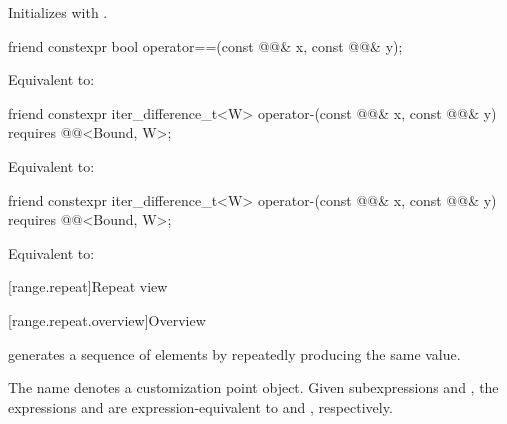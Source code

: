 \begin{itemdescr}
\pnum
\effects
Initializes  with .
\end{itemdescr}

\begin{itemdecl}
friend constexpr bool operator==(const @@& x, const @@& y);
\end{itemdecl}

\begin{itemdescr}
\pnum
\effects
Equivalent to: 
\end{itemdescr}

\begin{itemdecl}
friend constexpr iter_difference_t<W> operator-(const @@& x, const @@& y)
  requires @@<Bound, W>;
\end{itemdecl}

\begin{itemdescr}
\pnum
\effects
Equivalent to: 
\end{itemdescr}

\begin{itemdecl}
friend constexpr iter_difference_t<W> operator-(const @@& x, const @@& y)
  requires @@<Bound, W>;
\end{itemdecl}

\begin{itemdescr}
\pnum
\effects
Equivalent to: 
\end{itemdescr}

[range.repeat]{Repeat view}

[range.repeat.overview]{Overview}

\pnum
{} generates a sequence of elements
by repeatedly producing the same value.

\pnum
{}%
The name  denotes
a customization point object.
Given subexpressions  and ,
the expressions  and 
are expression-equivalent to
 and , respectively.

